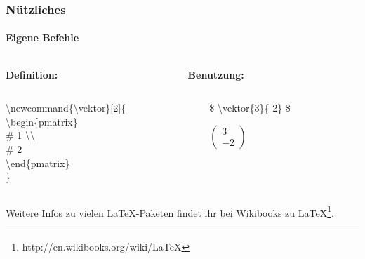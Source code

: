 \begin{frame}
\frametitle{Nützliches}
\framesubtitle{Eigene Befehle}
\begin{columns}
\hspace*{4.7mm}
\begin{column}{0.5\textwidth}
\textbf{Definition:}\\
\end{column}
\begin{column}{0.5\textwidth}
\textbf{Benutzung:}\\
\end{column}
\end{columns}
\bigskip
\begin{columns}
\hspace*{4.7mm}
\begin{column}{0.5\textwidth}
\begin{ttfamily}{\normalsize
\color{nounibaredI}\textbackslash newcommand\color{black}\{\textbackslash vektor\}[2]\{\\
\color{unibablueI}\textbackslash begin\color{black}\{pmatrix\}\\
\color{unibayellowI}\# 1 \color{nounibaredI}\textbackslash \textbackslash\\
\color{unibayellowI} \# 2\\
\color{unibablueI}\textbackslash end\color{black}\{pmatrix\}\\
\}\\
}
\end{ttfamily}
\end{column}
\begin{column}{0.5\textwidth}
\begin{ttfamily}{\normalsize
\color{unibayellowI}\$ \color{nounibaredI}\textbackslash vektor\color{black}\{3\}\{-2\} \color{unibayellowI}\$ \\}
\end{ttfamily}
\medskip
$
\begin{pmatrix}
3 \\ -2
\end{pmatrix}
$
\end{column}
\end{columns}
\bigskip
Weitere Infos zu vielen \LaTeX -Paketen findet ihr bei Wikibooks zu \LaTeX\footnote{http://en.wikibooks.org/wiki/LaTeX}.\\
\end{frame}

